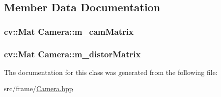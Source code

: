 \subsection{Member Data Documentation}
\subsubsection[{\texorpdfstring{m\+\_\+cam\+Matrix}{m_camMatrix}}]{\setlength{\rightskip}{0pt plus 5cm}cv\+::\+Mat Camera\+::m\+\_\+cam\+Matrix}\hypertarget{classCamera_a1a20cdb75b56f843febf9bcfceeed9ff}{}\label{classCamera_a1a20cdb75b56f843febf9bcfceeed9ff}
\subsubsection[{\texorpdfstring{m\+\_\+distor\+Matrix}{m_distorMatrix}}]{\setlength{\rightskip}{0pt plus 5cm}cv\+::\+Mat Camera\+::m\+\_\+distor\+Matrix}\hypertarget{classCamera_a1bdef6fb4df5f4b40d3f6e50b027348a}{}\label{classCamera_a1bdef6fb4df5f4b40d3f6e50b027348a}


The documentation for this class was generated from the following file\+:\begin{DoxyCompactItemize}
\item 
src/frame/\hyperlink{Camera_8hpp}{Camera.\+hpp}\end{DoxyCompactItemize}
